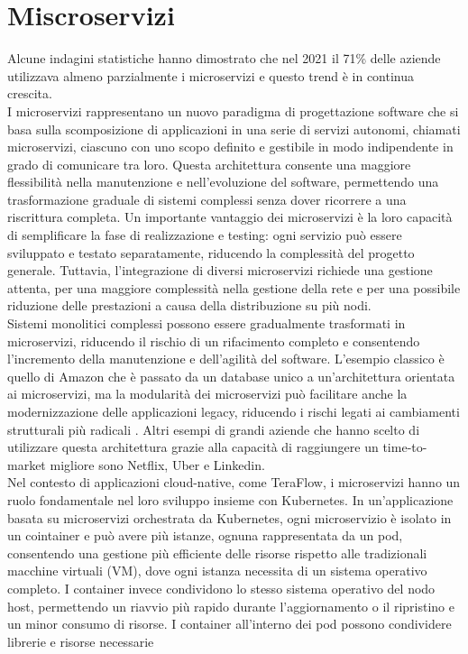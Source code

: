 \section{Miscroservizi}
Alcune indagini statistiche hanno dimostrato che nel 2021 il 71\% delle aziende utilizzava almeno parzialmente i microservizi \cite{stat} e questo trend è in continua crescita.
\\I microservizi rappresentano un nuovo paradigma di progettazione software che si basa sulla scomposizione di applicazioni in una serie di servizi autonomi, chiamati microservizi, ciascuno con uno scopo definito e gestibile in modo indipendente in grado di comunicare tra loro.
Questa architettura consente una maggiore flessibilità nella manutenzione e nell'evoluzione del software, permettendo una trasformazione graduale di sistemi complessi senza dover ricorrere a una riscrittura completa.
Un importante vantaggio dei microservizi è la loro capacità di semplificare la fase di realizzazione e testing: ogni servizio può essere sviluppato e testato separatamente, riducendo la complessità del progetto generale.
Tuttavia, l'integrazione di diversi microservizi richiede una gestione attenta, per una maggiore complessità nella gestione della rete e per una possibile riduzione delle prestazioni a causa della distribuzione su più nodi.
\\Sistemi monolitici complessi possono essere gradualmente trasformati in microservizi, riducendo il rischio di un rifacimento completo e consentendo l'incremento della manutenzione e dell'agilità del software.
L'esempio classico è quello di Amazon che è passato da un database unico a un'architettura orientata ai microservizi, ma la modularità dei microservizi può facilitare anche la modernizzazione delle applicazioni legacy, 
riducendo i rischi legati ai cambiamenti strutturali più radicali \cite{microse}. 
Altri esempi di grandi aziende che hanno scelto di utilizzare questa architettura grazie alla capacità di raggiungere un time-to-market migliore sono Netflix, Uber e Linkedin.
\\Nel contesto di applicazioni cloud-native, come TeraFlow, i microservizi hanno un ruolo fondamentale nel loro sviluppo insieme con Kubernetes.
In un'applicazione basata su microservizi orchestrata da Kubernetes, %
ogni microservizio è isolato in un cointainer e può avere più istanze, ognuna rappresentata da un pod, consentendo una gestione più efficiente delle risorse rispetto alle tradizionali macchine virtuali (VM),
dove ogni istanza necessita di un sistema operativo completo.
I container invece condividono lo stesso sistema operativo del nodo host, 
permettendo un riavvio più rapido durante l'aggiornamento o il ripristino \cite{artkub} e un minor consumo di risorse.
I container all'interno dei pod possono condividere librerie e risorse necessarie


